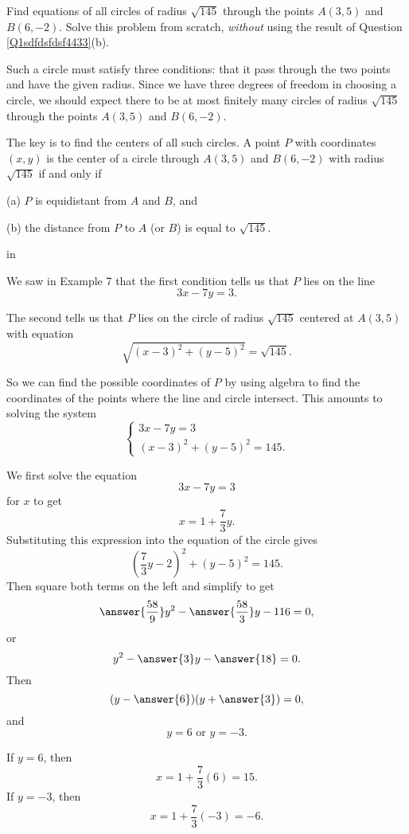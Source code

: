 \documentclass{ximera}
\newcommand{\pskip}{\vskip 0.1 in}
\begin{document}
\begin{example}  \label{Ex6}
Find equations of all circles of radius $\sqrt{145}$ through the points $A(3,5)$ and $B(6,-2)$. Solve this problem from scratch, \emph{without} using the result of Question \ref{Q1sdfdsfdsf4433}(b).


\begin{explanation}
Such a circle must satisfy three conditions: that it pass through the two points and have the given radius. Since we have three degrees of freedom in choosing a circle, we should expect there to be at most finitely many circles of radius $\sqrt{145}$ through the points $A(3,5)$ and $B(6,-2)$.

The key is to find the centers of all such circles. A point $P$ with coordinates $(x,y)$ is the center of a circle through $A(3,5)$ and $B(6,-2)$ with radius $\sqrt{145}$  if and only if 

(a) $P$ is equidistant from $A$ and $B$, and

(b) the distance from $P$ to $A$ (or $B$) is equal to $\sqrt{145}$.

\pskip

We saw in Example 7 that the first condition tells us that $P$ lies on the line
\[
        3x - 7y  = 3.
\] 

The second tells us that $P$ lies on the circle of radius $\sqrt{145}$ centered at $A(3,5)$ with equation 
\[
    \sqrt{(x-3)^2 + (y-5)^2} = \sqrt{145} .
\]

So we can find the possible coordinates of $P$ by using algebra to find the coordinates of the points where the line and circle intersect. This amounts to solving the system
\[
   \begin{cases}
      3x - 7y  = 3 \\
      (x-3)^2 + (y-5)^2 = 145 .  
   \end{cases}
\]

We first solve the equation
\[
    3x - 7y = 3
\]
for $x$ to get
\[ 
        x = 1 + \frac{7}{3}y .
\]
Substituting this expression into the equation of the circle gives
\[
   \left( \frac{7}{3}y - 2 \right)^2 + (y-5)^2 = 145.
\]
Then square both terms on the left and simplify to get
\[
    \answer{\frac{58}{9}}y^2 - \answer{\frac{58}{3}}y - 116 = 0 ,
\]
or
\[
       y^2 - \answer{3}y - \answer{18} = 0 . 
\]
Then 
\[
    (y-\answer{6})(y+\answer{3}) = 0 ,
\]
and 
\[
   y = 6 \text{ or } y= -3 .
\]

If $y=6$, then
\[
  x =  1 + \frac{7}{3}(6) = 15 .
\]
If $y=-3$, then
\[
    x =  1 + \frac{7}{3}(-3) = -6.
\]



\end{explanation}
\end{example}
\end{document}
